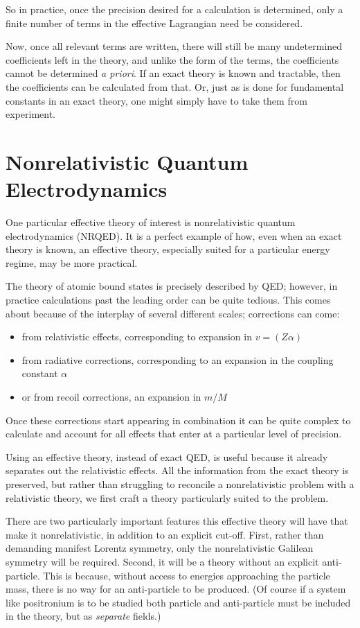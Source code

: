 So in practice, once the precision desired for a calculation is determined, only a finite number of terms in the effective Lagrangian need be considered.

Now, once all relevant terms are written, there will still be many undetermined coefficients left in the theory, and unlike the form of the terms, the coefficients cannot be determined {\it a priori}.  If an exact theory is known and tractable, then the coefficients can be calculated from that.  Or, just as is done for fundamental constants in an exact theory, one might simply have to take them from experiment.

\section{Nonrelativistic Quantum Electrodynamics}
One particular effective theory of interest is nonrelativistic quantum electrodynamics (NRQED).  It is a perfect example of how, even when an exact theory is known, an effective theory, especially suited for a particular energy regime, may be more practical.

The theory of atomic bound states is precisely described by QED; however, in practice calculations past the leading order can be quite tedious.  This comes about because of the interplay of several different scales; corrections can come:
\begin{itemize}
  \item from relativistic effects, corresponding to expansion in $v = (Z\alpha)$
  \item from radiative corrections, corresponding to an expansion in the coupling constant $\alpha$
  \item or from recoil corrections, an expansion in $m/M$
\end{itemize}  
Once these corrections start appearing in combination it can be quite complex to calculate and account for all effects that enter at a particular level of precision.

Using an effective theory, instead of exact QED, is useful because it already separates out the relativistic effects.  All the information from the exact theory is preserved, but rather than struggling to reconcile a nonrelativistic problem with a relativistic theory, we first craft a theory particularly suited to the problem.

There are two particularly important features this effective theory will have that make it nonrelativistic, in addition to an explicit cut-off.  First, rather than demanding manifest Lorentz symmetry, only the nonrelativistic Galilean symmetry will be required.  Second, it will be a theory without an explicit anti-particle.  This is because, without access to energies approaching the particle mass, there is no way for an anti-particle to be produced. (Of course if a system like positronium is to be studied both particle and anti-particle must be included in the theory, but as {\it separate} fields.)

